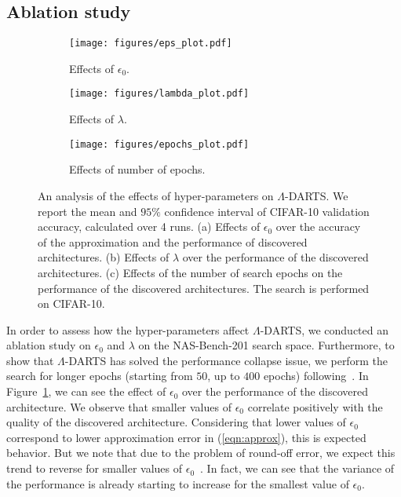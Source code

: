 \documentclass{article} \usepackage{fancyhdr, iclr2023_conference, times}
\newcommand{\mydarts}{$\Lambda$-DARTS\xspace}
\begin{document}
\subsection{Ablation study}
\begin{figure}[t]
\centering
\begin{subfigure}[]{0.3\textwidth}
    \texttt{[image: figures/eps\_plot.pdf]}
    \caption{Effects of $\epsilon_0$.}
    \label{fig:ablation-a}
\end{subfigure}\begin{subfigure}[]{0.3\textwidth}
    \texttt{[image: figures/lambda\_plot.pdf]}
    \caption{Effects of $\lambda$.}
    \label{fig:ablation-b}
\end{subfigure}\begin{subfigure}[]{0.3\textwidth}
    \texttt{[image: figures/epochs\_plot.pdf]}
    \caption{Effects of number of epochs.}
    \label{fig:ablation-c}
\end{subfigure}
\vspace{-10pt}
\caption{An analysis of the effects of hyper-parameters on \mydarts. We report the mean and $95\%$ confidence interval of CIFAR-10 validation accuracy, calculated over 4 runs. (a) Effects of $\epsilon_0$ over the accuracy of the approximation and the performance of discovered architectures. (b) Effects of $\lambda$ over the performance of the discovered architectures. (c) Effects of the number of search epochs on the performance of the discovered architectures. The search is performed on CIFAR-10.}
\vspace{-10pt}
\end{figure}
\par In order to assess how the hyper-parameters affect \mydarts, we conducted an ablation study on $\epsilon_0$ and $\lambda$ on the NAS-Bench-201 search space. Furthermore, to show that \mydarts has solved the performance collapse issue, we perform the search for longer epochs (starting from $50$, up to $400$ epochs) following~\citep{DBLP:conf/iclr/ChuW0LWY21, DBLP:journals/corr/abs-2203-01665}. In Figure~\ref{fig:ablation-a}, we can see the effect of $\epsilon_0$ over the performance of the discovered architecture. We observe that smaller values of $\epsilon_0$ correlate positively with the quality of the discovered architecture. Considering that lower values of $\epsilon_0$ correspond to lower approximation error in (\ref{eqn:approx}), this is expected behavior. But we note that due to the problem of round-off error, we expect this trend to reverse for smaller values of $\epsilon_0$~\citep{DBLP:journals/corr/abs-2009-07098}. In fact, we can see that the variance of the performance is already starting to increase for the smallest value of $\epsilon_0$.
\end{document}

